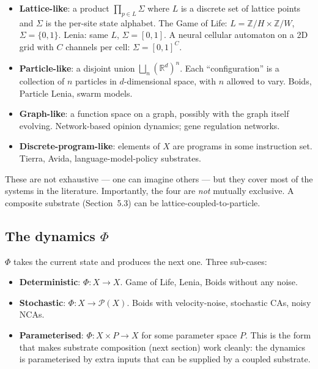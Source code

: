 \begin{itemize}[leftmargin=1.5em,itemsep=2pt]
  \item \textbf{Lattice-like}: a product $\prod_{p \in L} \Sigma$ where
    $L$ is a discrete set of lattice points and $\Sigma$ is the
    per-site state alphabet. The Game of Life: $L = \mathbb{Z}/H \times
    \mathbb{Z}/W$, $\Sigma = \{0,1\}$. Lenia: same $L$, $\Sigma =
    [0,1]$. A neural cellular automaton on a 2D grid with $C$ channels
    per cell: $\Sigma = [0,1]^C$.
  \item \textbf{Particle-like}: a disjoint union
    $\bigsqcup_n (\mathbb{R}^d)^n$. Each ``configuration'' is a
    collection of $n$ particles in $d$-dimensional space, with $n$
    allowed to vary. Boids, Particle Lenia, swarm models.
  \item \textbf{Graph-like}: a function space on a graph, possibly with
    the graph itself evolving. Network-based opinion dynamics; gene
    regulation networks.
  \item \textbf{Discrete-program-like}: elements of $X$ are programs in
    some instruction set. Tierra, Avida, language-model-policy
    substrates.
\end{itemize}

These are not exhaustive --- one can imagine others --- but they cover
most of the systems in the literature. Importantly, the four are
\emph{not} mutually exclusive. A composite substrate (Section~5.3) can
be lattice-coupled-to-particle.

\subsection*{The dynamics $\Phi$}

$\Phi$ takes the current state and produces the next one. Three
sub-cases:

\begin{itemize}[leftmargin=1.5em,itemsep=2pt]
  \item \textbf{Deterministic}: $\Phi : X \to X$. Game of Life, Lenia,
    Boids without any noise.
  \item \textbf{Stochastic}: $\Phi : X \to \mathcal{P}(X)$. Boids with
    velocity-noise, stochastic CAs, noisy NCAs.
  \item \textbf{Parameterised}: $\Phi : X \times P \to X$ for some
    parameter space $P$. This is the form that makes substrate
    composition (next section) work cleanly: the dynamics is
    parameterised by extra inputs that can be supplied by a coupled
    substrate.
\end{itemize}

